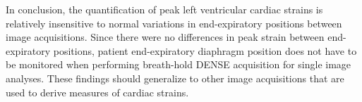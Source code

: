 	In conclusion, the quantification of peak left ventricular cardiac strains is relatively insensitive to normal variations in end-expiratory positions between image acquisitions. Since there were no differences in peak strain between end-expiratory positions, patient end-expiratory diaphragm position does not have to be monitored when performing breath-hold DENSE acquisition for single image analyses. These findings should generalize to other image acquisitions that are used to derive measures of cardiac strains.
	
	
	
